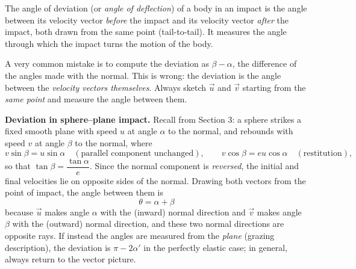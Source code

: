 \documentclass[11pt]{article}
\newcommand{\cle}[1]{{\popxbold\color{popdark}#1}}
\begin{document}
\begin{definition}
The \cle{angle of deviation} (or \emph{angle of deflection}) of a body in an impact is the angle between its velocity vector \emph{before} the impact and its velocity vector \emph{after} the impact, both drawn from the same point (tail-to-tail). It measures the angle through which the impact turns the motion of the body.
\end{definition}

\begin{attention}
A very common mistake is to compute the deviation as $\beta - \alpha$, the difference of the angles made with the normal. This is wrong: the deviation is the angle between the \emph{velocity vectors themselves}. Always sketch $\vec{u}$ and $\vec{v}$ starting from the \emph{same point} and measure the angle between them.
\end{attention}

\textbf{Deviation in sphere--plane impact.} Recall from Section 3: a sphere strikes a fixed smooth plane with speed $u$ at angle $\alpha$ to the normal, and rebounds with speed $v$ at angle $\beta$ to the normal, where
\[
v\sin\beta = u\sin\alpha \quad (\text{parallel component unchanged}), \qquad v\cos\beta = eu\cos\alpha \quad (\text{restitution}),
\]
so that $\tan\beta = \dfrac{\tan\alpha}{e}$. Since the normal component is \emph{reversed}, the initial and final velocities lie on opposite sides of the normal. Drawing both vectors from the point of impact, the angle between them is
\[
\boxed{\;\theta = \alpha + \beta\;}
\]
because $\vec{u}$ makes angle $\alpha$ with the (inward) normal direction and $\vec{v}$ makes angle $\beta$ with the (outward) normal direction, and these two normal directions are opposite rays. If instead the angles are measured from the \emph{plane} (grazing description), the deviation is $\pi - 2\alpha'$ in the perfectly elastic case; in general, always return to the vector picture.
\end{document}
